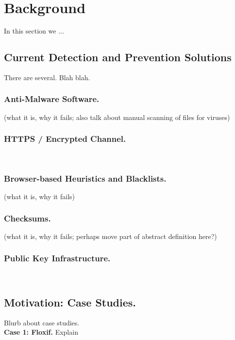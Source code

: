 \section{Background} \label{sec:background}

In this section we ...


\subsection{Current Detection and Prevention Solutions}

There are several. Blah blah.

\subsubsection{Anti-Malware Software.}    (what it is, why it fails; also talk
about manual scanning of files for viruses)

\subsubsection{HTTPS / Encrypted Channel.}   ~\cite{HTTP, HTTPS, TLS1, TLS2, DTLS}

\subsubsection{Browser-based Heuristics and Blacklists.}    (what it is, why it
fails)

\subsubsection{Checksums.}    (what it is, why it fails; perhaps move part of
abstract definition here?)

\subsubsection{Public Key Infrastructure.}   ~\cite{DANE1, DANE2, DANE3, OpenPGP1}

\subsection{Motivation: Case Studies.}

Blurb about case studies. \\

\noindent\textbf{Case 1: Floxif.} Explain \\

